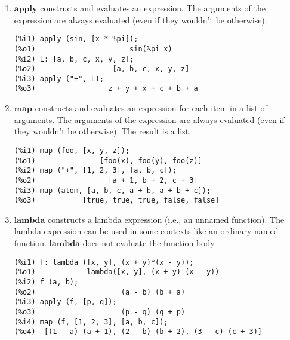\documentclass[12pt]{article}
\begin{document}
\begin{enumerate}

\item $\mathbf{apply}$ constructs and evaluates an expression.
The arguments of the expression are always evaluated (even if they wouldn't be otherwise).

\begin{verbatim}
(%i1) apply (sin, [x * %pi]);
(%o1)                      sin(%pi x)
(%i2) L: [a, b, c, x, y, z];
(%o2)                  [a, b, c, x, y, z]
(%i3) apply ("+", L);
(%o3)                 z + y + x + c + b + a
\end{verbatim}

\item $\mathbf{map}$ constructs and evaluates an expression for each item in a list of arguments.
The arguments of the expression are always evaluated (even if they wouldn't be otherwise).
The result is a list.

\begin{verbatim}
(%i1) map (foo, [x, y, z]);
(%o1)               [foo(x), foo(y), foo(z)]
(%i2) map ("+", [1, 2, 3], [a, b, c]);
(%o2)                 [a + 1, b + 2, c + 3]
(%i3) map (atom, [a, b, c, a + b, a + b + c]);
(%o3)           [true, true, true, false, false]
\end{verbatim}

\item $\mathbf{lambda}$ constructs a lambda expression (i.e., an unnamed function).
The lambda expression can be used in some contexts like an ordinary named function.
$\mathbf{lambda}$ does not evaluate the function body.

\begin{verbatim}
(%i1) f: lambda ([x, y], (x + y)*(x - y));
(%o1)            lambda([x, y], (x + y) (x - y))
(%i2) f (a, b);
(%o2)                    (a - b) (b + a)
(%i3) apply (f, [p, q]);
(%o3)                    (p - q) (q + p)
(%i4) map (f, [1, 2, 3], [a, b, c]);
(%o4)  [(1 - a) (a + 1), (2 - b) (b + 2), (3 - c) (c + 3)]
\end{verbatim}

\end{enumerate}
\end{document}
